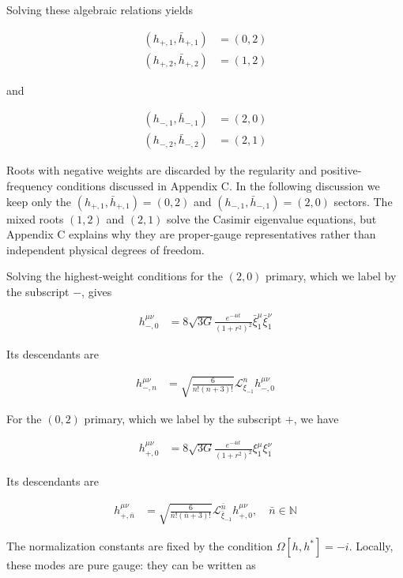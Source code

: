 Solving these algebraic relations yields

\begin{align}
(h_{+,1},\bar{h}_{+,1}) & =(0,2) \\
(h_{+,2},\bar{h}_{+,2}) & =(1,2)
\end{align}

and

\begin{align}
(h_{-,1},\bar{h}_{-,1}) & =(2,0) \\
(h_{-,2},\bar{h}_{-,2}) & =(2,1)
\end{align}

Roots with negative weights are discarded by the regularity and positive-frequency conditions discussed in Appendix C. In the following discussion we keep only the \((h_{+,1},\bar{h}_{+,1})=(0,2)\) and \((h_{-,1},\bar{h}_{-,1})=(2,0)\) sectors. The mixed roots \((1,2)\) and \((2,1)\) solve the Casimir eigenvalue equations, but Appendix C explains why they are proper-gauge representatives rather than independent physical degrees of freedom.

Solving the highest-weight conditions for the \((2,0)\) primary, which we label by the subscript \(-\), gives

\begin{align}
h^{\mu \nu}_{-,0} & =8\sqrt{ 3G } \frac{e^{-4it}}{(1+r^{2})^{2}}\bar{\xi}_{1}^{\mu}\bar{\xi}_{1}^{\nu}
\end{align}

Its descendants are

\begin{align}
h^{\mu \nu}_{-,n} & =\sqrt{ \frac{6}{n!(n+3)!} }\mathcal{L}_{\xi _{-1}}^{n}h^{\mu \nu}_{-,0}
\end{align}

For the \((0,2)\) primary, which we label by the subscript \(+\), we have

\begin{align}
h^{\mu \nu}_{+,0} & =8\sqrt{ 3G } \frac{e^{-4it}}{(1+r^{2})^{2}}\xi_{1}^{\mu}\xi_{1}^{\nu}
\end{align}

Its descendants are

\begin{align}
h^{\mu \nu}_{+,\bar{n}} & =\sqrt{ \frac{6}{\bar{n}!(\bar{n}+3)!} }\mathcal{L}_{\bar{\xi}_{-1}}^{\bar{n}}h_{+,0}^{\mu \nu},\quad \bar{n}\in \mathbb{N}
\end{align}

The normalization constants are fixed by the condition \(\Omega[h,h^{*}]=-i\). Locally, these modes are pure gauge: they can be written as

